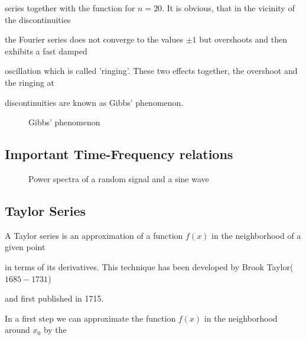 series together with the function for $n=20$. It is obvious, that in the vicinity of the discontinuities

the Fourier series does not converge to the values $\pm 1$ but overshoots and then exhibits a fast damped 

oscillation which is called 'ringing'. These two effects together, the overshoot and the ringing at 

discontinuities are known as Gibbs' phenomenon.





\begin{figure}[!ht]

    \centerline{\epsfxsize=12cm \epsfysize=8cm } \svs

    \caption{Gibbs' phenomenon} \label{fig56}

\end{figure}



\subsection{Important Time-Frequency relations}



\begin{figure}[!h]

    \centerline{\epsfxsize=12cm  }

    \caption{Power spectra of a random signal and a sine wave} \label{fig57}

\end{figure}



\newpage

\subsection{Taylor Series}\label{taylor}

A Taylor series is an approximation of a function $f(x)$ in the neighborhood of a given point

in terms of its derivatives. This technique has been developed by Brook Taylor($1685-1731$)

and first published in 1715.



In a first step we can approximate the function $f(x)$ in the neighborhood around $x_0$ by the

